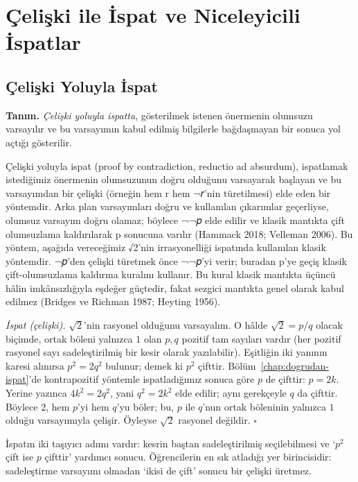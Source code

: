 \chapter{Çelişki ile İspat ve Niceleyicili İspatlar}
\label{chap:celiski-ispat}


\section{Çelişki Yoluyla İspat}

\begin{tcolorbox}[bookbox,colback=cDef]
\textbf{\textsf{\textcolor{cAcc}{Tanım.}}}\quad
\emph{Çelişki yoluyla ispatta}, gösterilmek istenen önermenin olumsuzu varsayılır ve bu varsayımın kabul edilmiş bilgilerle bağdaşmayan bir sonuca yol açtığı gösterilir.
\end{tcolorbox}

Çelişki yoluyla ispat (proof by contradiction, reductio ad absurdum), ispatlamak istediğimiz önermenin olumsuzunun doğru olduğunu varsayarak başlayan ve bu varsayımdan bir çelişki (örneğin hem r hem ¬𝑟’nin türetilmesi) elde eden bir yöntemdir. Arka plan varsayımları doğru ve kullanılan çıkarımlar geçerliyse, olumsuz varsayım doğru olamaz; böylece ¬¬𝑝 elde edilir ve klasik mantıkta çift olumsuzlama kaldırılarak p sonucuna varılır (Hammack 2018; Velleman 2006). Bu yöntem, aşağıda vereceğimiz √2’nin irrasyonelliği ispatında kullanılan klasik yöntemdir. ¬𝑝’den çelişki türetmek önce ¬¬𝑝’yi verir; buradan p’ye geçiş klasik çift-olumsuzlama kaldırma kuralını kullanır. Bu kural klasik mantıkta üçüncü hâlin imkânsızlığıyla eşdeğer güçtedir, fakat sezgici mantıkta genel olarak kabul edilmez (Bridges ve Richman 1987; Heyting 1956).

\begin{ornek}
\emph{İspat (çelişki).} $\sqrt2$’nin rasyonel olduğunu varsayalım. O hâlde $\sqrt2=p/q$ olacak biçimde, ortak böleni yalnızca $1$ olan $p,q$ pozitif tam sayıları vardır (her pozitif rasyonel sayı sadeleştirilmiş bir kesir olarak yazılabilir). Eşitliğin iki yanının karesi alınırsa $p^2=2q^2$ bulunur; demek ki $p^2$ çifttir. Bölüm~\ref{chap:dogrudan-ispat}’de kontrapozitif yöntemle ispatladığımız sonuca göre $p$ de çifttir: $p=2k$. Yerine yazınca $4k^2=2q^2$, yani $q^2=2k^2$ elde edilir; aynı gerekçeyle $q$ da çifttir. Böylece $2$, hem $p$’yi hem $q$’yu böler; bu, $p$ ile $q$’nun ortak böleninin yalnızca $1$ olduğu varsayımıyla çelişir. Öyleyse $\sqrt2$ rasyonel değildir. $\square$

\smallskip
İspatın iki taşıyıcı adımı vardır: kesrin baştan sadeleştirilmiş seçilebilmesi ve ‘$p^2$ çift ise $p$ çifttir’ yardımcı sonucu. Öğrencilerin en sık atladığı yer birincisidir: sadeleştirme varsayımı olmadan ‘ikisi de çift’ sonucu bir çelişki üretmez.
\end{ornek}

